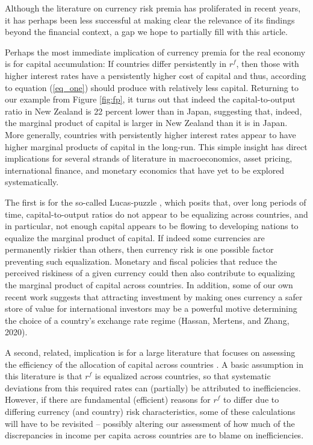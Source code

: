 \documentclass{ar-1col}
\begin{document}
Although the literature on currency risk premia has proliferated in recent years, it has perhaps been less successful at making clear the relevance of its findings beyond the financial context, a gap we hope to partially fill with this article.

Perhaps the most immediate implication of currency premia for the real economy is for capital accumulation: If countries differ persistently in $r^f$, then those with higher interest rates have a persistently higher cost of capital and thus, according to equation (\ref{eq_one}) should produce with relatively less capital. Returning to our example from Figure \ref{fig:fp}, it turns out that indeed the capital-to-output ratio in New Zealand is 22 percent lower than in Japan, suggesting that, indeed, the marginal product of capital is larger in New Zealand than it is in Japan. More generally, countries with persistently higher interest rates appear to have higher marginal products of capital in the long-run. This simple insight has direct implications for several strands of literature in macroeconomics, asset pricing, international finance, and monetary economics that have yet to be explored systematically.

The first is for the so-called Lucas-puzzle \citep{Lucas1990}, which posits that, over long periods of time, capital-to-output ratios do not appear to be equalizing across countries, and in particular, not enough capital appears to be flowing to developing nations to equalize the marginal product of capital. If indeed some currencies are permanently riskier than others, then currency risk is one possible factor preventing such equalization. Monetary and fiscal policies that reduce the perceived riskiness of a given currency could then also contribute to equalizing the marginal product of capital across countries. In addition, some of our own recent work suggests that attracting investment by making ones currency a safer store of value for international investors may be a powerful motive determining the choice of a country's exchange rate regime (Hassan, Mertens, and Zhang, 2020).

A second, related, implication is for a large literature that focuses on assessing the efficiency of the allocation of capital across countries \citep{HallJones1997, CaselliFeyrer2007}. A basic assumption in this literature is that $r^f$ is equalized across countries, so that systematic deviations from this required rates can (partially) be attributed to inefficiencies. However, if there are fundamental (efficient) reasons for $r^f$ to differ due to differing currency (and country) risk characteristics, some of these calculations will have to be revisited -- possibly altering our assessment of how much of the discrepancies in income per capita across countries are to blame on inefficiencies.
\end{document}
